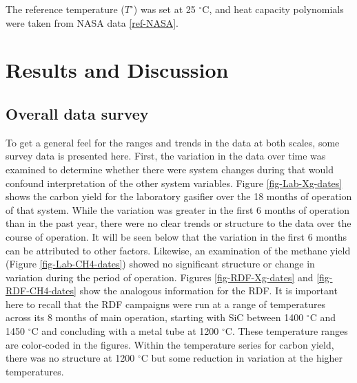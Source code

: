 \documentclass[11pt,twocolumn]{article}
\begin{document}
The reference temperature ($T^{\circ}$) was set at 25 $^{\circ}$C, and heat capacity polynomials were taken from NASA data \ref{ref-NASA}.



\section*{Results and Discussion}

\subsection*{Overall data survey}
To get a general feel for the ranges and trends in the data at both scales, some survey data is presented here.  First, the variation in the data over time was examined to determine whether there were system changes during that would confound interpretation of the other system variables.  Figure \ref{fig-Lab-Xg-dates} shows the carbon yield for the laboratory gasifier over the 18 months of operation of that system.  While the variation was greater in the first 6 months of operation than in the past year, there were no clear trends or structure to the data over the course of operation.  It will be seen below that the variation in the first 6 months can be attributed to other factors.  Likewise, an examination of the methane yield (Figure \ref{fig-Lab-CH4-dates}) showed no significant structure or change in variation during the period of operation.  Figures \ref{fig-RDF-Xg-dates} and \ref{fig-RDF-CH4-dates} show the analogous information for the RDF.  It is important here to recall that the RDF campaigns were run at a range of temperatures across its 8 months of main operation, starting with SiC between 1400 $^{\circ}$C and 1450 $^{\circ}$C and concluding with a metal tube at 1200 $^{\circ}$C.  These temperature ranges are color-coded in the figures.  Within the temperature series for carbon yield, there was no structure at 1200 ${^\circ}$C but some reduction in variation at the higher temperatures.  
\end{document}
